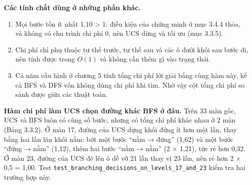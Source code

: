 \textbf{Các tính chất dùng ở những phần khác.}

\begin{enumerate}
\def\labelenumi{\arabic{enumi}.}
\tightlist
\item
  Mọi bước tốn ít nhất 1,10 \textgreater{} 1: điều kiện của chứng minh ở mục 3.4.4 thỏa, và không có chu trình chi phí 0, nên UCS dừng và tối ưu (mục 3.3.5).
\item
  Chi phí chỉ phụ thuộc tư thế trước, tư thế sau và các ô dưới khối sau bước đi, nên tính được trong \(O(1)\) và không cần thêm gì vào trạng thái.
\item
  Cả năm cấu hình ở chương 5 tính tổng chi phí lời giải bằng cùng hàm này, kể cả BFS và DFS vốn không dùng chi phí khi tìm. Nhờ vậy cột tổng chi phí so sánh được giữa các thuật toán.
\end{enumerate}

\textbf{Hàm chi phí làm UCS chọn đường khác BFS ở đâu.} Trên 33 màn gốc, UCS và BFS luôn có cùng số bước, nhưng có tổng chi phí khác nhau ở 2 màn (Bảng 3.3.2). Ở màn 17, đường của UCS dựng khối đứng ít hơn một lần, thay bằng hai lần lăn khối nằm: bớt một bước ``nằm → đứng'' (1,62) và một bước ``đứng → nằm'' (1,12), thêm hai bước ``nằm → nằm'' (2 × 1,21), tức rẻ hơn 0,32. Ở màn 23, đường của UCS đè lên ô dễ vỡ 21 lần thay vì 23 lần, nên rẻ hơn 2 × 0,5 = 1,00. Test \texttt{test\_\allowbreak{}branching\_\allowbreak{}decisions\_\allowbreak{}on\_\allowbreak{}levels\_\allowbreak{}17\_\allowbreak{}and\_\allowbreak{}23} kiểm tra hai trường hợp này.



